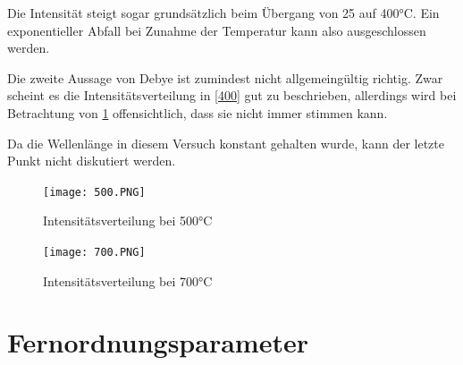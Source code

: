 \documentclass[
	a4paper,
	12pt,
	pagesize,
	ngerman
]{scrartcl}
\begin{document}
Die Intensität steigt sogar grundsätzlich beim Übergang von 25 auf 400°C. Ein exponentieller Abfall bei Zunahme der Temperatur kann also ausgeschlossen werden.

Die zweite Aussage von Debye ist zumindest nicht allgemeingültig richtig. Zwar scheint es die Intensitätsverteilung in \cref{400} gut zu beschrieben, allerdings wird bei Betrachtung von \cref{500} offensichtlich, dass sie nicht immer stimmen kann. 

Da die Wellenlänge in diesem Versuch konstant gehalten wurde, kann der letzte Punkt nicht diskutiert werden.

\begin{figure}[h]
	\centering
	\texttt{[image: 500.PNG]}
	\caption{Intensitätsverteilung bei 500°C}
	\label{500}
\end{figure}

\begin{figure}[h]
	\centering
	\texttt{[image: 700.PNG]}
	\caption{Intensitätsverteilung bei 700°C}
	\label{700}
\end{figure}

\newpage
\section{Fernordnungsparameter}
\end{document}
